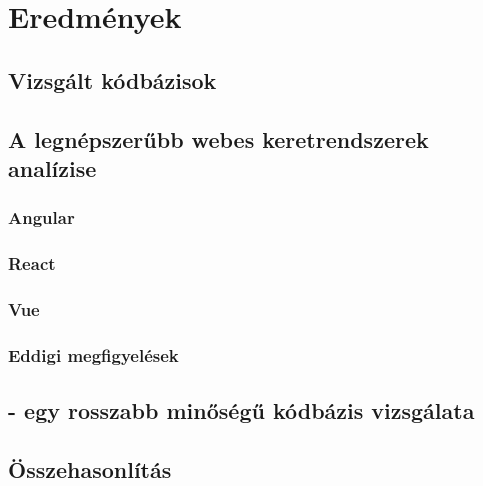 \chapter{Eredmények}
\label{ch:results}

\section{Vizsgált kódbázisok}

\section{A legnépszerűbb webes keretrendszerek analízise}

\subsection{Angular}

\subsection{React}

\subsection{Vue}

\subsection{Eddigi megfigyelések}

\section{ - egy rosszabb minőségű kódbázis vizsgálata}

\section{Összehasonlítás}